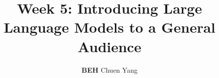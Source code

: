 \documentclass{article} %
\title{Week 5: Introducing Large Language Models to a General Audience}
\author{\textbf{BEH} Chuen Yang}
\begin{document}
\ifcolmsubmission
\linenumbers
\fi

\maketitle


\end{document}
